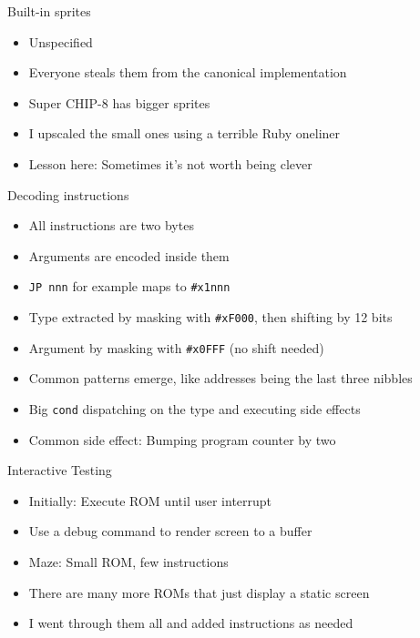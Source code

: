 \documentclass[presentation]{beamer}
\begin{document}
\begin{frame}[label={sec:orgac95272}]{Built-in sprites}
\begin{itemize}
\item Unspecified
\item Everyone steals them from the canonical implementation
\item Super CHIP-8 has bigger sprites
\item I upscaled the small ones using a terrible Ruby oneliner
\item Lesson here: Sometimes it's not worth being clever
\end{itemize}
\end{frame}

\begin{frame}[fragile,label={sec:org467ca91}]{Decoding instructions}
 \begin{itemize}
\item All instructions are two bytes
\item Arguments are encoded inside them
\item \texttt{JP nnn} for example maps to \texttt{\#x1nnn}
\item Type extracted by masking with \texttt{\#xF000}, then shifting by 12 bits
\item Argument by masking with \texttt{\#x0FFF} (no shift needed)
\item Common patterns emerge, like addresses being the last three nibbles
\item Big \texttt{cond} dispatching on the type and executing side effects
\item Common side effect: Bumping program counter by two
\end{itemize}
\end{frame}

\begin{frame}[label={sec:orgf0cb306}]{Interactive Testing}
\begin{itemize}
\item Initially: Execute ROM until user interrupt
\item Use a debug command to render screen to a buffer
\item Maze: Small ROM, few instructions
\item There are many more ROMs that just display a static screen
\item I went through them all and added instructions as needed
\end{itemize}
\end{frame}
\end{document}
